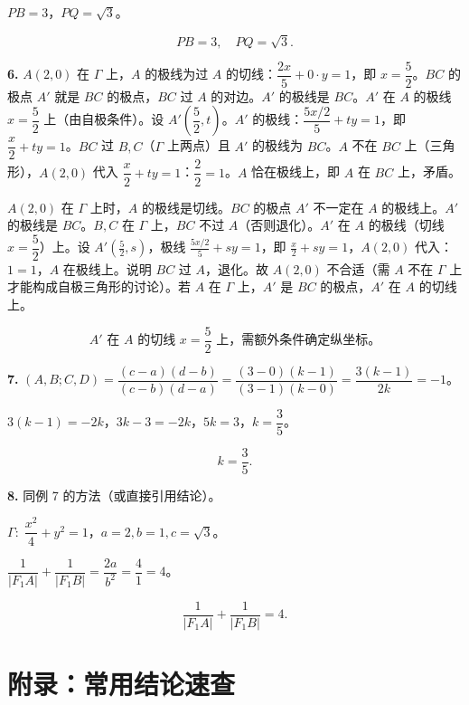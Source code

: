 \documentclass[12pt,a4paper]{ctexart}
\theoremstyle{definition}
\begin{document}
\begin{knowledgebox}[练习题答案]
$PB=3$，$PQ=\sqrt{3}$。

\[
  \boxed{PB=3,\quad PQ=\sqrt{3}.}
\]

\medskip

\textbf{6.} $A(2,0)$ 在 $\Gamma$ 上，$A$ 的极线为过 $A$ 的切线：$\dfrac{2x}{5}+0\cdot y=1$，即 $x=\dfrac{5}{2}$。$BC$ 的极点 $A'$ 就是 $BC$ 的极点，$BC$ 过 $A$ 的对边。$A'$ 的极线是 $BC$。$A'$ 在 $A$ 的极线 $x=\dfrac{5}{2}$ 上（由自极条件）。设 $A'\!\left(\dfrac{5}{2},t\right)$。$A'$ 的极线：$\dfrac{5x/2}{5}+ty=1$，即 $\dfrac{x}{2}+ty=1$。$BC$ 过 $B,C$（$\Gamma$ 上两点）且 $A'$ 的极线为 $BC$。$A$ 不在 $BC$ 上（三角形），$A(2,0)$ 代入 $\dfrac{x}{2}+ty=1$：$\dfrac{2}{2}=1$。$A$ 恰在极线上，即 $A$ 在 $BC$ 上，矛盾。

$A(2,0)$ 在 $\Gamma$ 上时，$A$ 的极线是切线。$BC$ 的极点 $A'$ 不一定在 $A$ 的极线上。$A'$ 的极线是 $BC$。$B,C$ 在 $\Gamma$ 上，$BC$ 不过 $A$（否则退化）。$A'$ 在 $A$ 的极线（切线 $x=\dfrac{5}{2}$）上。设 $A'(\frac{5}{2},s)$，极线 $\frac{5x/2}{5}+sy=1$，即 $\frac{x}{2}+sy=1$，$A(2,0)$ 代入：$1=1$，$A$ 在极线上。说明 $BC$ 过 $A$，退化。故 $A(2,0)$ 不合适（需 $A$ 不在 $\Gamma$ 上才能构成自极三角形的讨论）。若 $A$ 在 $\Gamma$ 上，$A'$ 是 $BC$ 的极点，$A'$ 在 $A$ 的切线上。

\[
  \boxed{A'\text{ 在 }A\text{ 的切线 }x=\frac{5}{2}\text{ 上，需额外条件确定纵坐标。}}
\]

\medskip

\textbf{7.} $(A,B;C,D)=\dfrac{(c-a)(d-b)}{(c-b)(d-a)}=\dfrac{(3-0)(k-1)}{(3-1)(k-0)}=\dfrac{3(k-1)}{2k}=-1$。

$3(k-1)=-2k$，$3k-3=-2k$，$5k=3$，$k=\dfrac{3}{5}$。

\[
  \boxed{k=\frac{3}{5}.}
\]

\medskip

\textbf{8.} 同例 7 的方法（或直接引用结论）。

$\Gamma:\;\dfrac{x^2}{4}+y^2=1$，$a=2,b=1,c=\sqrt{3}$。

$\dfrac{1}{|F_1A|}+\dfrac{1}{|F_1B|}=\dfrac{2a}{b^2}=\dfrac{4}{1}=4$。

\[
  \boxed{\frac{1}{|F_1A|}+\frac{1}{|F_1B|}=4.}
\]

\end{knowledgebox}


\section{附录：常用结论速查}
\end{document}
